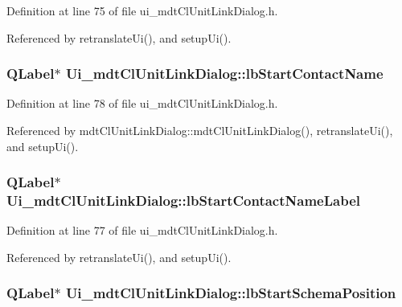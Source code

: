 Definition at line 75 of file ui\-\_\-mdt\-Cl\-Unit\-Link\-Dialog.\-h.



Referenced by retranslate\-Ui(), and setup\-Ui().

\hypertarget{class_ui__mdt_cl_unit_link_dialog_a7c8f325f510ce4acdce55ec87ef06238}{
\subsubsection[{lb\-Start\-Contact\-Name}]{\setlength{\rightskip}{0pt plus 5cm}Q\-Label$\ast$ Ui\-\_\-mdt\-Cl\-Unit\-Link\-Dialog\-::lb\-Start\-Contact\-Name}}\label{class_ui__mdt_cl_unit_link_dialog_a7c8f325f510ce4acdce55ec87ef06238}


Definition at line 78 of file ui\-\_\-mdt\-Cl\-Unit\-Link\-Dialog.\-h.



Referenced by mdt\-Cl\-Unit\-Link\-Dialog\-::mdt\-Cl\-Unit\-Link\-Dialog(), retranslate\-Ui(), and setup\-Ui().

\hypertarget{class_ui__mdt_cl_unit_link_dialog_a3d09a922611ccd01bc0851ee0090445b}{
\subsubsection[{lb\-Start\-Contact\-Name\-Label}]{\setlength{\rightskip}{0pt plus 5cm}Q\-Label$\ast$ Ui\-\_\-mdt\-Cl\-Unit\-Link\-Dialog\-::lb\-Start\-Contact\-Name\-Label}}\label{class_ui__mdt_cl_unit_link_dialog_a3d09a922611ccd01bc0851ee0090445b}


Definition at line 77 of file ui\-\_\-mdt\-Cl\-Unit\-Link\-Dialog.\-h.



Referenced by retranslate\-Ui(), and setup\-Ui().

\hypertarget{class_ui__mdt_cl_unit_link_dialog_a74c83cf4c55cf0f2c6a620d9b4eb797b}{
\subsubsection[{lb\-Start\-Schema\-Position}]{\setlength{\rightskip}{0pt plus 5cm}Q\-Label$\ast$ Ui\-\_\-mdt\-Cl\-Unit\-Link\-Dialog\-::lb\-Start\-Schema\-Position}}\label{class_ui__mdt_cl_unit_link_dialog_a74c83cf4c55cf0f2c6a620d9b4eb797b}


